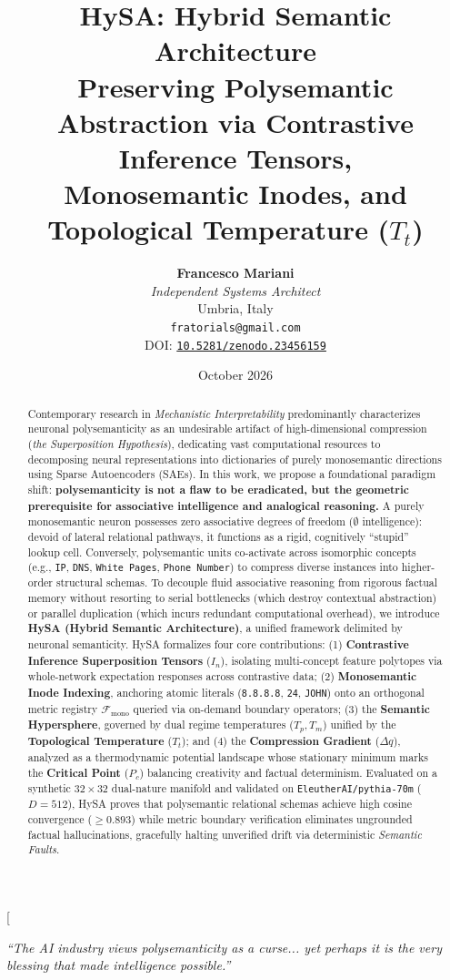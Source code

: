 \documentclass[10pt,twocolumn]{article}
\title{\vspace{-1.1cm}\textbf{\Large HySA: Hybrid Semantic Architecture \\ Preserving Polysemantic Abstraction via Contrastive Inference Tensors, \\ Monosemantic Inodes, and Topological Temperature \texorpdfstring{($T_t$)}{(Tt)}}}
\author{
    \textbf{Francesco Mariani} \\
    \textit{Independent Systems Architect} \\
    Umbria, Italy \\
    \texttt{fratorials@gmail.com} \\
    {\footnotesize DOI: \href{https://doi.org/10.5281/zenodo.23456159}{\texttt{10.5281/zenodo.23456159}}}
}
\date{October 2026}
\theoremstyle{definition}
\begin{document}
\twocolumn[
  \begin{@twocolumnfalse}
    \maketitle
    \begin{center}
        \vspace{-0.35cm}
        \textit{``The AI industry views polysemanticity as a curse... yet perhaps it is the very blessing that made intelligence possible.''}
        \vspace{0.25cm}
    \end{center}
    \begin{abstract}
      \noindent Contemporary research in \textit{Mechanistic Interpretability} predominantly characterizes neuronal polysemanticity as an undesirable artifact of high-dimensional compression (\textit{the Superposition Hypothesis}), dedicating vast computational resources to decomposing neural representations into dictionaries of purely monosemantic directions using Sparse Autoencoders (SAEs). In this work, we propose a foundational paradigm shift: \textbf{polysemanticity is not a flaw to be eradicated, but the geometric prerequisite for associative intelligence and analogical reasoning.} A purely monosemantic neuron possesses zero associative degrees of freedom ($\emptyset$ intelligence): devoid of lateral relational pathways, it functions as a rigid, cognitively ``stupid'' lookup cell. Conversely, polysemantic units co-activate across isomorphic concepts (e.g., \texttt{IP}, \texttt{DNS}, \texttt{White Pages}, \texttt{Phone Number}) to compress diverse instances into higher-order structural schemas. To decouple fluid associative reasoning from rigorous factual memory without resorting to serial bottlenecks (which destroy contextual abstraction) or parallel duplication (which incurs redundant computational overhead), we introduce \textbf{HySA (Hybrid Semantic Architecture)}, a unified framework delimited by neuronal semanticity. HySA formalizes four core contributions: (1) \textbf{Contrastive Inference Superposition Tensors} ($I_n$), isolating multi-concept feature polytopes via whole-network expectation responses across contrastive data; (2) \textbf{Monosemantic Inode Indexing}, anchoring atomic literals (\texttt{8.8.8.8}, \texttt{24}, \texttt{JOHN}) onto an orthogonal metric registry $\mathcal{F}_{\mathrm{mono}}$ queried via on-demand boundary operators; (3) the \textbf{Semantic Hypersphere}, governed by dual regime temperatures ($T_p, T_m$) unified by the \textbf{Topological Temperature} ($T_t$); and (4) the \textbf{Compression Gradient} ($\Delta q$), analyzed as a thermodynamic potential landscape whose stationary minimum marks the \textbf{Critical Point} ($P_c$) balancing creativity and factual determinism. Evaluated on a synthetic $32 \times 32$ dual-nature manifold and validated on \texttt{EleutherAI/pythia-70m} ($D=512$), HySA proves that polysemantic relational schemas achieve high cosine convergence ($\ge 0.893$) while metric boundary verification eliminates ungrounded factual hallucinations, gracefully halting unverified drift via deterministic \textit{Semantic Faults}.

\end{abstract}
\end{@twocolumnfalse}
\end{document}
